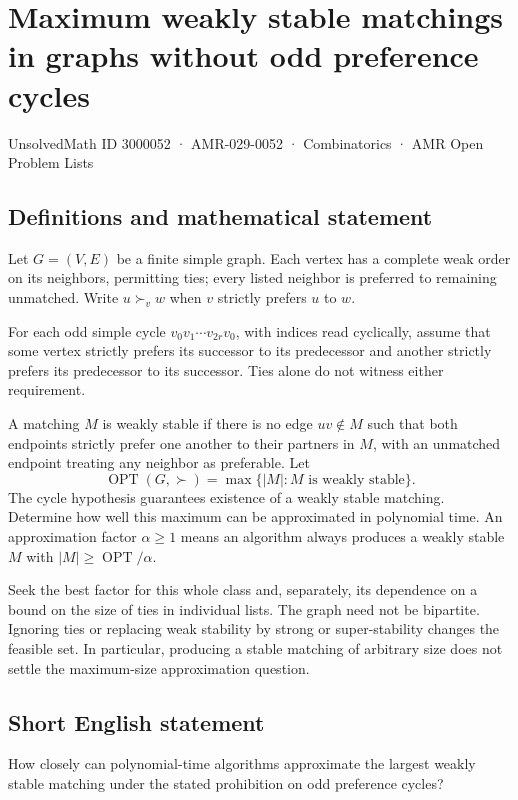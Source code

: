 \documentclass[11pt,a4paper]{article}
\begin{document}
\section*{Maximum weakly stable matchings in graphs without odd preference cycles}\label{3000052}
{\small UnsolvedMath ID 3000052 · AMR-029-0052 · Combinatorics · AMR Open Problem Lists}
\subsection{Definitions and mathematical statement}
Let $G=(V,E)$ be a finite simple graph. Each vertex has a complete
weak order on its neighbors, permitting ties; every listed neighbor is
preferred to remaining unmatched. Write $u\succ_v w$ when $v$
strictly prefers $u$ to $w$.

For each odd simple cycle $v_0v_1\cdots v_{2r}v_0$, with indices
read cyclically, assume that some vertex strictly prefers its successor
to its predecessor and another strictly prefers its predecessor to its
successor. Ties alone do not witness either requirement.

A matching $M$ is weakly stable if there is no edge $uv\notin M$
such that both endpoints strictly prefer one another to their partners
in $M$, with an unmatched endpoint treating any neighbor as preferable.
Let
\[
 \operatorname{OPT}(G,\succ)=\max\{|M|:M\text{ is weakly stable}\}.
\]
The cycle hypothesis guarantees existence of a weakly stable matching.
Determine how well this maximum can be approximated in polynomial time.
An approximation factor $\alpha\ge1$ means an algorithm always produces
a weakly stable $M$ with $|M|\ge\operatorname{OPT}/\alpha$.

Seek the best factor for this whole class and, separately, its dependence
on a bound on the size of ties in individual lists. The graph need not
be bipartite. Ignoring ties or replacing weak stability by strong or
super-stability changes the feasible set. In particular, producing a
stable matching of arbitrary size does not settle the maximum-size
approximation question.
\subsection{Short English statement}
How closely can polynomial-time algorithms approximate the largest weakly stable matching under the stated prohibition on odd preference cycles?
\end{document}
